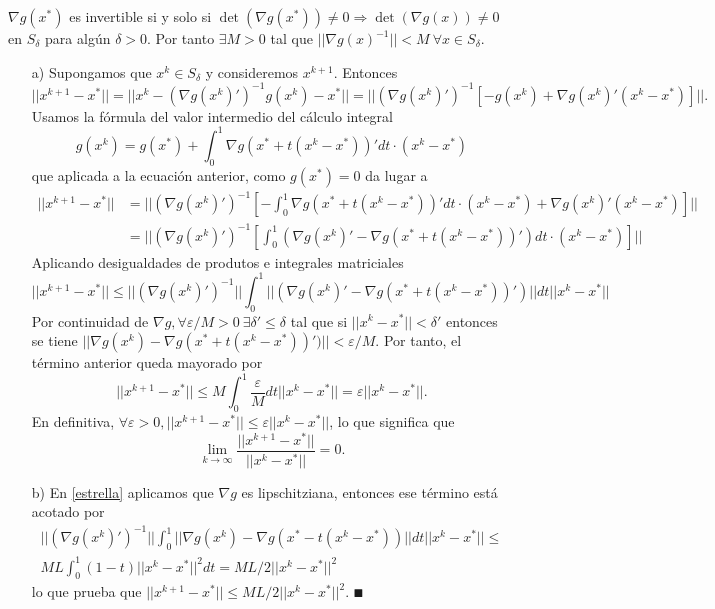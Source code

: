 \documentclass[MIOP.tex]{subfiles}
\begin{document}
\begin{dem}
$\nabla g(x^*)$ es invertible si y solo si $\det(\nabla g(x^*))\neq 0\Rightarrow\det(\nabla g(x))\neq 0$ en $S_\delta$ para algún $\delta>0$. Por tanto $\exists M>0$ tal que $||\nabla g(x)^{-1}||<M\ \forall x\in S_\delta$. 
\begin{itemize}
\item[a)] Supongamos que $x^k\in S_\delta$ y consideremos $x^{k+1}$. Entonces
$$||x^{k+1}-x^*||=||x^k-(\nabla g(x^k)')^{-1}g(x^k)-x^*||=||(\nabla g(x^k)')^{-1}[-g(x^k)+\nabla g(x^k)'(x^k-x^*)]||.$$
Usamos la fórmula del valor intermedio del cálculo integral
$$g(x^k)=g(x^*)+\int_0^1\nabla g(x^*+t(x^k-x^*))'dt\cdot(x^k-x^*)$$
que aplicada a la ecuación anterior, como $g(x^*)=0$  da lugar a
\begin{align*}
||x^{k+1}-x^*||&=||(\nabla g(x^k)')^{-1}\left[-\int_0^1\nabla g(x^*+t(x^k-x^*))'dt\cdot(x^k-x^*)+\nabla g(x^k)'(x^k-x^*)\right]||\\
&=||(\nabla g(x^k)')^{-1}\left[\int_0^1(\nabla g(x^k)'-\nabla g(x^*+t(x^k-x^*))')dt\cdot(x^k-x^*)\right]||
\end{align*}
Aplicando desigualdades de produtos e integrales matriciales
\begin{equation}\label{estrella}
||x^{k+1}-x^*||\leq||(\nabla g(x^k)')^{-1}||\int_0^1||(\nabla g(x^k)'-\nabla g(x^*+t(x^k-x^*))')||dt||x^k-x^*||
\end{equation}
Por continuidad de $\nabla g, \forall\varepsilon/M>0\ \exists\delta'\leq\delta$ tal que si $||x^k-x^*||<\delta'$ entonces se tiene $ ||\nabla g(x^k)-\nabla g(x^*+t(x^k-x^*))')||<\varepsilon/M$. Por tanto, el término anterior queda mayorado por
$$||x^{k+1}-x^*|| \leq M\int_0^1\frac{\varepsilon}{M} dt ||x^k-x^*||=\varepsilon ||x^k-x^*||.$$
En definitiva, $\forall\varepsilon>0, ||x^{k+1}-x^*||\leq\varepsilon||x^k-x^*||$, lo que significa que $$\lim_{k\to\infty}\frac{||x^{k+1}-x^*||}{||x^k-x^*||}=0.$$
\item[b)] En \ref{estrella} aplicamos que $\nabla g$ es lipschitziana, entonces ese término está acotado por
\begin{gather*}
||(\nabla g(x^k)')^{-1}||\int_0^1||\nabla g(x^k)-\nabla g(x^*-t(x^k-x^*))||dt||x^k-x^*||\leq\\
 ML\int_0^1 (1-t)||x^k-x^*||^2dt=ML/2||x^k-x^*||^2
\end{gather*}
lo que prueba que $ ||x^{k+1}-x^*||\leq ML/2||x^k-x^*||^2$. $\QED$
\end{itemize}
\end{dem}
\end{document}
